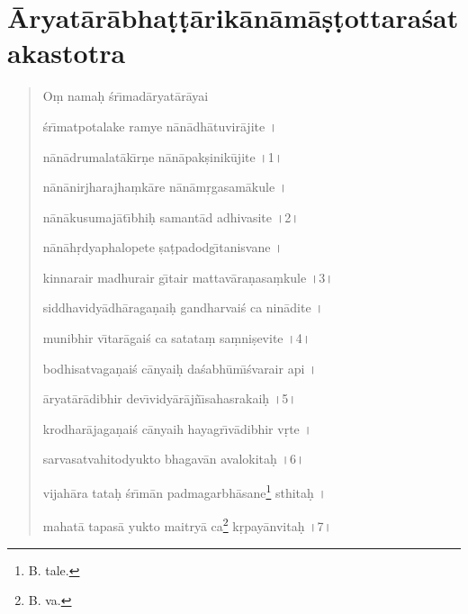 \documentclass[a4paper, 11pt, oneside, french]{article}
\begin{document}
\section{\={A}ryat\={a}r\={a}bha\d{t}\d{t}\={a}rik\={a}n\={a}m\={a}\d{s}\d{t}ottara\'{s}atakastotra}
\begin{quotation}
O\d{m} nama\d{h} \'{s}r\={\i}mad\={a}ryat\={a}r\={a}yai

\bigskip

\'{s}r\={\i}matpotalake ramye n\={a}n\={a}dh\={a}tuvir\={a}jite \texthindi{।}

n\={a}n\={a}drumalat\={a}k\={\i}r\d{n}e n\={a}n\={a}pak\d{s}inik\={u}jite \texthindi{।}1\texthindi{।}

\bigskip

n\={a}n\={a}nirjharajha\d{m}k\={a}re n\={a}n\={a}m\d{r}gasam\={a}kule \texthindi{।}

n\={a}n\={a}kusumaj\={a}t\={\i}bhi\d{h} samant\={a}d adhivasite \texthindi{।}2\texthindi{।}

\bigskip

n\={a}n\={a}h\d{r}dyaphalopete \d{s}a\d{t}padodg\={\i}tanisvane \texthindi{।}

kinnarair madhurair g\={\i}tair mattav\={a}ra\d{n}asa\d{m}kule \texthindi{।}3\texthindi{।}

\bigskip

siddhavidy\={a}dh\={a}raga\d{n}ai\d{h} gandharvai\'{s} ca nin\={a}dite \texthindi{।}

munibhir v\={\i}tar\={a}gai\'{s} ca satata\d{m} sa\d{m}ni\d{s}evite \texthindi{।}4\texthindi{।}

\bigskip

bodhisatvaga\d{n}ai\'{s} c\={a}nyai\d{h} da\'{s}abh\={u}m\={\i}\'{s}varair api \texthindi{।}

\={a}ryat\={a}r\={a}dibhir dev\={\i}vidy\={a}r\={a}j\~{n}\={\i}sahasrakai\d{h} \texthindi{।}5\texthindi{।}

\bigskip

krodhar\={a}jaga\d{n}ai\'{s} c\={a}nyaih hayagr\={\i}v\={a}dibhir v\d{r}te \texthindi{।}

sarvasatvahitodyukto bhagav\={a}n avalokita\d{h} \texthindi{।}6\texthindi{।}

\bigskip

vijah\={a}ra tata\d{h} \'{s}r\={\i}m\={a}n padmagarbh\={a}sane\footnote{B. tale.} sthita\d{h} \texthindi{।}

mahat\={a} tapas\={a} yukto maitry\={a} ca\footnote{B. va.} k\d{r}pay\={a}nvita\d{h} \texthindi{।}7\texthindi{।}


\end{quotation}
\end{document}
